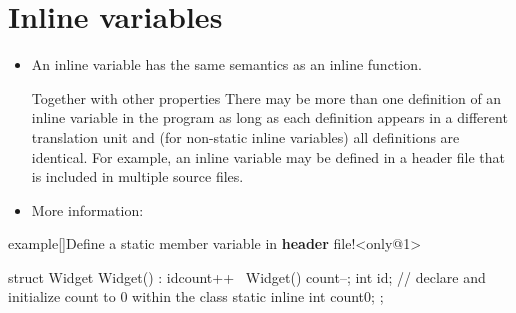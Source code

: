 \section{Inline variables}
\begin{frame}[fragile]{\insertsectionhead}
    \vspace{-3mm}
    \begin{itemize}
        \item An inline variable has the same semantics as an inline function.\\[1mm]
              {\scriptsize Together with other properties
                There may be more than one definition of an inline variable in the program as long as each definition appears in a different translation unit and (for non-static inline variables) all definitions are identical. For example, an inline variable may be defined in a header file that is included in multiple source files.\par}
        \item More information: 
    \end{itemize}
    \begin{varblock}{example}[\textwidth]{Define a static member variable in \textbf{header} file!}<only@1>
        \begin{Cpp}
            struct Widget {
                Widget() : id{count++} {}
                ~Widget() { count--; }
                int id;
                // declare and initialize count to 0 within the class
                static inline int count{0};
            };
        \end{Cpp}
    \end{varblock}
\end{frame}

